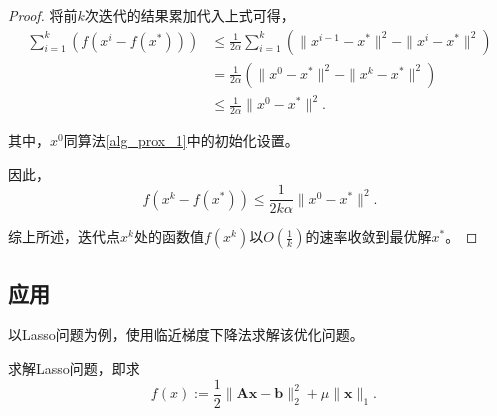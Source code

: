 \begin{proof}
    将前$k$次迭代的结果累加代入上式可得，
    \begin{equation}
        \begin{split}
            \sum_{i=1}^{k}(f(x^{i} - f(x^{*}))) &\leq \frac{1}{2\alpha}\sum_{i=1}^{k}(\|x^{i-1}-x^{*}\|^{2} - \|x^{i}-x^{*}\|^{2}) \\
            &= \frac{1}{2\alpha}(\|x^{0}-x^{*}\|^{2} - \|x^{k}-x^{*}\|^{2}) \\
            &\leq \frac{1}{2\alpha} \|x^{0} - x^{*}\|^{2}.
        \end{split}
    \end{equation}

    其中，$x^{0}$同算法\ref{alg_prox_1}中的初始化设置。

    因此，
    \begin{equation}
        f(x^{k}-f(x^{*})) \leq \frac{1}{2k\alpha}\|x^{0}-x^{*}\|^{2}.
    \end{equation}

    综上所述，迭代点$x^{k}$处的函数值$f(x^{k})$以$O(\frac{1}{k})$的速率收敛到最优解$x^{*}$。
\end{proof}

\subsection{应用}

以Lasso问题为例，使用临近梯度下降法求解该优化问题。

\begin{problem}
    求解Lasso问题，即求
    \begin{equation}
        \mathop{\mathrm{min}\limits_{x}} f(x) := \frac{1}{2}\|\bm{A} \bm{x}-\bm{b}\|_{2}^{2} + \mu\|\bm{x}\|_{1}.
    \end{equation}
\end{problem}

